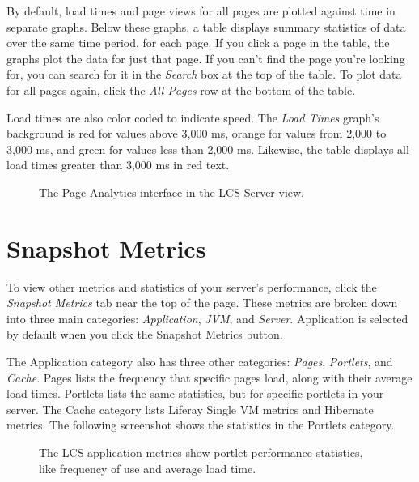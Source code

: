 By default, load times and page views for all pages are plotted against
time in separate graphs. Below these graphs, a table displays summary
statistics of data over the same time period, for each page. If you
click a page in the table, the graphs plot the data for just that page.
If you can't find the page you're looking for, you can search for it in
the \emph{Search} box at the top of the table. To plot data for all
pages again, click the \emph{All Pages} row at the bottom of the table.

Load times are also color coded to indicate speed. The \emph{Load Times}
graph's background is red for values above 3,000 ms, orange for values
from 2,000 to 3,000 ms, and green for values less than 2,000 ms.
Likewise, the table displays all load times greater than 3,000 ms in red
text.

\begin{figure}
\centering
{}
\caption{The Page Analytics interface in the LCS Server view.}
\end{figure}

\section{Snapshot Metrics}\label{snapshot-metrics}

To view other metrics and statistics of your server's performance, click
the \emph{Snapshot Metrics} tab near the top of the page. These metrics
are broken down into three main categories: \emph{Application},
\emph{JVM}, and \emph{Server}. Application is selected by default when
you click the Snapshot Metrics button.

The Application category also has three other categories: \emph{Pages},
\emph{Portlets}, and \emph{Cache}. Pages lists the frequency that
specific pages load, along with their average load times. Portlets lists
the same statistics, but for specific portlets in your server. The Cache
category lists Liferay Single VM metrics and Hibernate metrics. The
following screenshot shows the statistics in the Portlets category.

\begin{figure}
\centering
{}
\caption{The LCS application metrics show portlet performance
statistics, like frequency of use and average load time.}
\end{figure}


